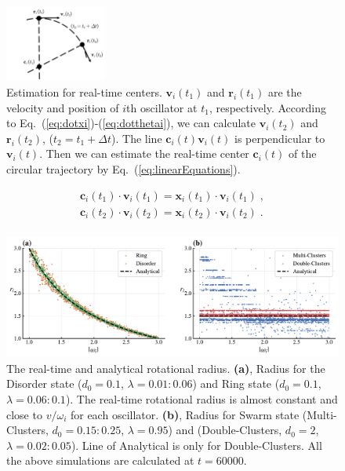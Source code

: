 \documentclass[%
 aip,
 amsmath,amssymb,
 reprint,%
]{revtex4-1}
\begin{document}
\begin{figure}
    \includegraphics[width=0.3\textwidth]{./figs/CenterEps.pdf}
    \caption{\label{fig:CenterEps} Estimation for real-time centers. $\mathbf{v}_i(t_1)$ and $\mathbf{r}_i(t_1)$ are the velocity and position of $i$th oscillator at $t_1$, respectively. According to Eq.~(\ref{eq:dotxi})-(\ref{eq:dotthetai}), we can calculate $\mathbf{v}_i(t_2)$ and $\mathbf{r}_i(t_2)$, ($t_2=t_1+\Delta t$). 
    The line $\mathbf{c}_i(t)\mathbf{v}_i(t)$ is perpendicular to $\mathbf{v}_i(t)$.
    Then we can estimate the real-time center $\mathbf{c}_i(t)$ of the circular trajectory by Eq.~(\ref{eq:linearEquations}).}
\end{figure}

\begin{equation}\label{eq:linearEquations}
    \begin{array}{c}
        \mathbf{c}_i\left( t_1 \right) \cdot \mathbf{v}_i\left( t_1 \right) =\mathbf{x}_i\left( t_1 \right) \cdot \mathbf{v}_i\left( t_1 \right)\;,\\
        \mathbf{c}_i\left( t_2 \right) \cdot \mathbf{v}_i\left( t_2 \right) =\mathbf{x}_i\left( t_2 \right) \cdot \mathbf{v}_i\left( t_2 \right)\;.\\
    \end{array}
\end{equation}
 
\begin{figure}
    \includegraphics[width=\textwidth]{./figs/radiusOmega.pdf}
    \caption{
        \label{fig:radiusOmega} The real-time and analytical rotational radius.
        \textbf{(a)}, Radius for the Disorder state ($d_0=0.1$, $\lambda=0.01:0.06$) and Ring state ($d_0=0.1$, $\lambda=0.06:0.1$). The real-time rotational radius is almost constant and close to $v/\omega_i$ for each oscillator. 
        \textbf{(b)}, Radius for Swarm state (Multi-Clusters, $d_0=0.15:0.25$, $\lambda=0.95$) and (Double-Clusters, $d_0=2$, $\lambda=0.02:0.05$). Line of Analytical is only for Double-Clusters.
        All the above simulations are calculated at $t=60000$. 
    }
\end{figure}
\end{document}
